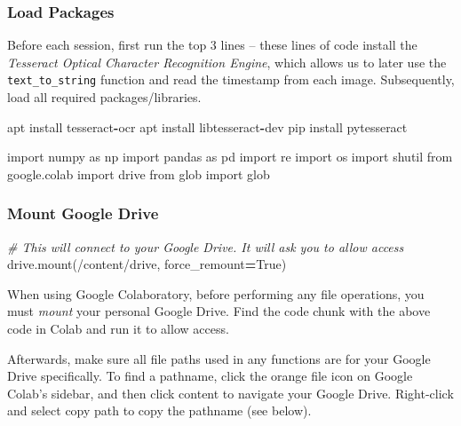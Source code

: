 \documentclass[
]{article}
\newenvironment{Shaded}{\begin{snugshade}}{\end{snugshade}}
\newcommand{\CommentTok}[1]{\textcolor[rgb]{0.56,0.35,0.01}{\textit{#1}}}
\newcommand{\ImportTok}[1]{#1}
\newcommand{\NormalTok}[1]{#1}
\newcommand{\OperatorTok}[1]{\textcolor[rgb]{0.81,0.36,0.00}{\textbf{#1}}}
\newcommand{\StringTok}[1]{\textcolor[rgb]{0.31,0.60,0.02}{#1}}
\newcommand{\VariableTok}[1]{\textcolor[rgb]{0.00,0.00,0.00}{#1}}
\begin{document}
\hypertarget{load-packages}{%
\subsubsection{Load Packages}\label{load-packages}}

Before each session, first run the top 3 lines -- these lines of code install the \emph{Tesseract Optical Character Recognition Engine}, which allows us to later use the \texttt{text\_to\_string} function and read the timestamp from each image. Subsequently, load all required packages/libraries.

\begin{Shaded}
\begin{Highlighting}[]
\NormalTok{apt install tesseract}\OperatorTok{{-}}\NormalTok{ocr}
\NormalTok{apt install libtesseract}\OperatorTok{{-}}\NormalTok{dev}
\NormalTok{pip install pytesseract}

\ImportTok{import}\NormalTok{ numpy }\ImportTok{as}\NormalTok{ np}
\ImportTok{import}\NormalTok{ pandas }\ImportTok{as}\NormalTok{ pd}
\ImportTok{import}\NormalTok{ re}
\ImportTok{import}\NormalTok{ os}
\ImportTok{import}\NormalTok{ shutil}
\ImportTok{from}\NormalTok{ google.colab }\ImportTok{import}\NormalTok{ drive}
\ImportTok{from}\NormalTok{ glob }\ImportTok{import}\NormalTok{ glob}
\end{Highlighting}
\end{Shaded}

\hypertarget{mount-google-drive}{%
\subsubsection{Mount Google Drive}\label{mount-google-drive}}

\begin{Shaded}
\begin{Highlighting}[]
\CommentTok{\# This will connect to your Google Drive. It will ask you to allow access}
\NormalTok{drive.mount(}\StringTok{\textquotesingle{}/content/drive\textquotesingle{}}\NormalTok{, force\_remount}\OperatorTok{=}\VariableTok{True}\NormalTok{)}
\end{Highlighting}
\end{Shaded}

When using Google Colaboratory, before performing any file operations, you must \emph{mount} your personal Google Drive. Find the code chunk with the above code in Colab and run it to allow access.

Afterwards, make sure all file paths used in any functions are for your Google Drive specifically. To find a pathname, click the orange file icon on Google Colab's sidebar, and then click content to navigate your Google Drive. Right-click and select copy path to copy the pathname (see below).
\end{document}
